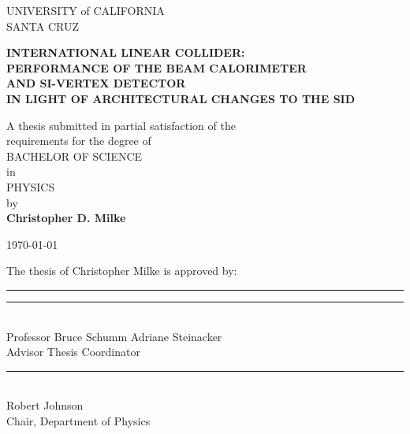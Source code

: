 \documentclass{report}
\begin{document}
	\begin{titlepage} \begin{singlespace}
        \begin{center} \begin{noindent} \begin{large}
            UNIVERSITY of CALIFORNIA \\ SANTA CRUZ

            \vspace{\baselineskip}

            \textbf{INTERNATIONAL LINEAR COLLIDER: \\
                PERFORMANCE OF THE BEAM CALORIMETER \\ 
                AND SI-VERTEX DETECTOR \\
                IN LIGHT OF ARCHITECTURAL CHANGES TO THE SID}

            \vspace{\baselineskip}
            A thesis submitted in partial satisfaction of the \\ requirements for the degree of \\
            \vspace{\baselineskip}
            BACHELOR OF SCIENCE \\
            \vspace{\baselineskip}
            in \\
            \vspace{\baselineskip}
            PHYSICS \\
            \vspace{\baselineskip}
            by \\
            \vspace{\baselineskip}
            \textbf{Christopher D. Milke} \\
            \vspace{\baselineskip}

            \today \\
            \vspace*{\fill}

            The thesis of Christopher Milke is approved by: \\
            \end{large}
            \vspace{1.5cm}
            \rule{70mm}{.5pt} \hfill \rule{70mm}{.5pt} \\
            Professor Bruce Schumm \hfill Adriane Steinacker \\
            Advisor \hfill Thesis Coordinator \\
            \vspace{1.5cm}
            \rule{70mm}{.5pt} \\
            Robert Johnson \\
            Chair, Department of Physics \\
        \end{noindent} \end{center}

	\end{singlespace} \end{titlepage}
\end{document}
